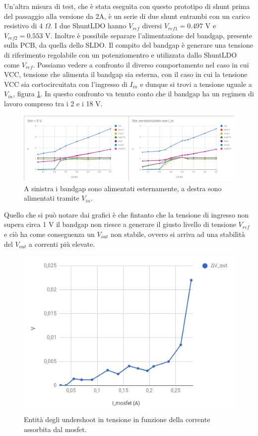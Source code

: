 Un'altra misura di test, che è stata eseguita con questo prototipo di shunt prima del passaggio alla versione da 2A, è un serie di due shunt entrambi con un carico resistivo di 4 $\Omega$. I due ShuntLDO hanno $V_{ref}$ diversi $V_{ref1}=0.497$ V e $V_{ref2}=0.553$ V. Inoltre è possibile separare l'alimentazione del bandgap, presente sulla PCB, da quella dello SLDO. Il compito del bandgap è generare una tensione di riferimento regolabile con un potenziomentro e utilizzata dallo ShuntLDO come $V_{ref}$.
Possiamo vedere a confronto il diverso comportamento nel caso in cui VCC, tensione che alimenta il bandgap sia esterna, con il caso in cui la tensione VCC sia cortocircuitata con l'ingresso di $I_{in}$ e dunque si trovi a tensione uguale a $V_{in}$, figura \ref{SLDO5Serie}. In questo confronto va tenuto conto che il bandgap ha un regimen di lavoro compreso tra  i 2 e i 18 V. 
\begin{figure}
\centering
\includegraphics[scale=.3]{Immagini/SLDO5Serie}
\caption{A sinistra i bandgap sono alimentati esternamente, a destra sono alimentati tramite $V_{in}$.}
\label{SLDO5Serie}
\end{figure}
Quello che si può notare dai grafici è che fintanto che la tensione di ingresso non supera circa 1 V il bandgap non riesce a generare il giusto livello di tensione $V_{ref}$ e ciò ha come conseguenza un $V_{out}$ non stabile, ovvero si arriva ad una stabilità del $V_{out}$ a correnti più elevate.

\begin{figure}
\centering
\includegraphics[scale=.3]{Immagini/SLDO5singlepulse}
\caption{Entità degli undershoot in tensione in funzione della corrente assorbita dal mosfet.}
\label{SLDO5singlepulse}
\end{figure}

